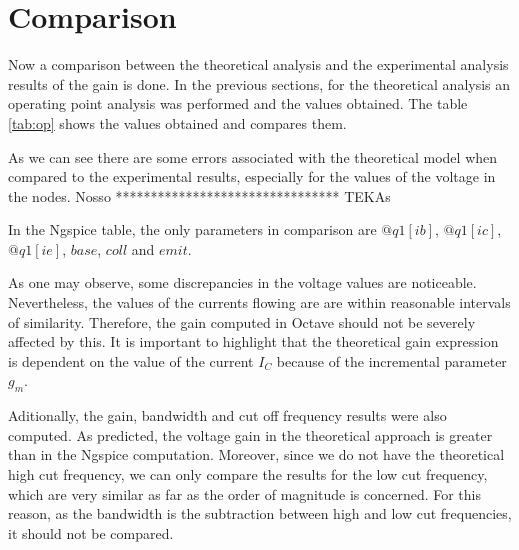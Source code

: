 \section{Comparison}
\label{section:comparison}

\par Now a comparison between the theoretical analysis and the experimental analysis results of the gain is done. In the previous sections, for the theoretical analysis an operating point analysis was performed and the values obtained. The table \ref{tab:op} shows the values obtained and compares them.

\par As we can see there are some errors associated with the theoretical model when compared to the experimental results, especially for the values of the voltage in the nodes.
Nosso
********************************
TEKAs



In the Ngspice table, the only parameters in comparison are $@q1[ib]$, $@q1[ic]$, $@q1[ie]$, $base$, $coll$ and $emit$.
\par As one may observe, some discrepancies in the voltage values are noticeable. Nevertheless, the values of the currents flowing are are within reasonable intervals of similarity. Therefore, the gain computed in Octave should not be severely affected by this. It is important to highlight that the theoretical gain expression is dependent on the value of the current $I_{C}$ because of the incremental parameter $g_{m}$. 

\par Aditionally, the gain, bandwidth and cut off frequency results were also computed. As predicted, the voltage gain in the theoretical approach is greater than in the Ngspice computation. Moreover, since we do not have the theoretical high cut frequency, we can only compare the results for the low cut frequency, which are very similar as far as the order of magnitude is concerned. For this reason, as the bandwidth is the subtraction between high and low cut frequencies, it should not be compared.









